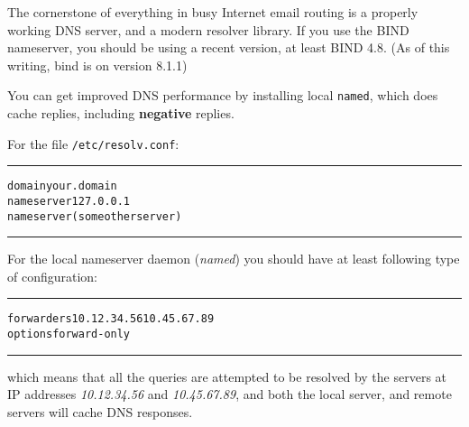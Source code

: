 

The cornerstone of everything in busy Internet email routing is a properly
working DNS server, and a modern resolver library. If you use the BIND 
nameserver, you should be using a recent version, at least BIND 4.8.
(As of this writing, bind is on version 8.1.1)

You can get improved DNS performance by installing local {\tt named},
which does cache replies, including {\bf negative} replies.

For the file {\tt /etc/resolv.conf}:
\begin{alltt}\medskip\hrule\medskip
domain     your.domain
nameserver 127.0.0.1
nameserver (some other server)
\medskip\hrule\medskip\end{alltt}


For the local nameserver daemon ({\em named}) you should have
at least following type of configuration:
\begin{alltt}\medskip\hrule\medskip
forwarders 10.12.34.56  10.45.67.89
options forward-only
\medskip\hrule\medskip\end{alltt}

which means that all the queries are attempted to be resolved
by the servers at IP addresses {\em 10.12.34.56} and
{\em 10.45.67.89}, and both the local server, and remote
servers will cache DNS responses.
